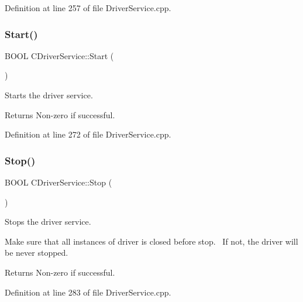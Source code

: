 Definition at line 257 of file Driver\+Service.\+cpp.

\mbox{\label{class_c_driver_service_a148e17da476c4fdc6028f257369fa184}} 
\subsubsection{\texorpdfstring{Start()}{Start()}}
{\footnotesize\ttfamily B\+O\+OL C\+Driver\+Service\+::\+Start (\begin{DoxyParamCaption}{ }\end{DoxyParamCaption})}



Starts the driver service. 

\begin{DoxyReturn}{Returns}
Non-\/zero if successful. 
\end{DoxyReturn}


Definition at line 272 of file Driver\+Service.\+cpp.

\mbox{\label{class_c_driver_service_a13872e379fe113d50a9592d2b6afbfa2}} 
\subsubsection{\texorpdfstring{Stop()}{Stop()}}
{\footnotesize\ttfamily B\+O\+OL C\+Driver\+Service\+::\+Stop (\begin{DoxyParamCaption}{ }\end{DoxyParamCaption})}



Stops the driver service. 

Make sure that all instances of driver is closed before stop.~\newline
If not, the driver will be never stopped.~\newline
 \begin{DoxyReturn}{Returns}
Non-\/zero if successful. 
\end{DoxyReturn}


Definition at line 283 of file Driver\+Service.\+cpp.

\mbox{\label{class_c_driver_service_a52b6dc6a44270d9069f0e450d5a839d4}} 
